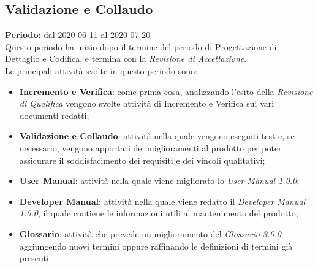 \subsection{Validazione e Collaudo}
\textbf{Periodo}: dal 2020-06-11 al 2020-07-20 \\
Questo periodo ha inizio dopo il termine del periodo di Progettazione di Dettaglio e Codifica, e termina con la \textit{Revisione di Accettazione}. \\
Le principali attività svolte in questo periodo sono:
\begin{itemize}
	\item \textbf{Incremento e Verifica}: come prima cosa, analizzando l'esito della \textit{Revisione di Qualifica} vengono svolte attività di Incremento e Verifica sui vari documenti redatti;
	\item \textbf{Validazione e Collaudo}: attività nella quale vengono eseguiti test e, se necessario, vengono apportati dei miglioramenti al prodotto per poter assicurare il soddisfacimento dei requisiti e dei vincoli qualitativi;
	\item \textbf{User Manual}: attività nella quale viene migliorato lo \textit{User Manual 1.0.0};
	\item \textbf{Developer Manual}: attività nella quale viene redatto il \textit{Developer Manual 1.0.0}, il quale contiene le informazioni utili al mantenimento del prodotto;
	\item \textbf{Glossario}: attività che prevede un miglioramento del \textit{Glossario 3.0.0} aggiungendo nuovi termini oppure raffinando le definizioni di termini già presenti.
\end{itemize}
